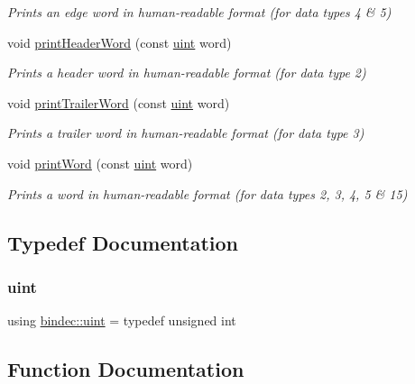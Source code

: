 \begin{DoxyCompactItemize}
\begin{DoxyCompactList}\small\item\em Prints an edge word in human-\/readable format (for data types 4 \& 5) \end{DoxyCompactList}\item 
void \hyperlink{namespacebindec_a185046fdda824c32d42f246df1f1bbba}{print\+Header\+Word} (const \hyperlink{namespacebindec_a61700e6ffcfc677215bfdf223803e735}{uint} word)
\begin{DoxyCompactList}\small\item\em Prints a header word in human-\/readable format (for data type 2) \end{DoxyCompactList}\item 
void \hyperlink{namespacebindec_a7d697577845df9e5e04a8fbbc118dcc5}{print\+Trailer\+Word} (const \hyperlink{namespacebindec_a61700e6ffcfc677215bfdf223803e735}{uint} word)
\begin{DoxyCompactList}\small\item\em Prints a trailer word in human-\/readable format (for data type 3) \end{DoxyCompactList}\item 
void \hyperlink{namespacebindec_ac6d286aca6c2fa2fa29938e4d8247cfa}{print\+Word} (const \hyperlink{namespacebindec_a61700e6ffcfc677215bfdf223803e735}{uint} word)
\begin{DoxyCompactList}\small\item\em Prints a word in human-\/readable format (for data types 2, 3, 4, 5 \& 15) \end{DoxyCompactList}\end{DoxyCompactItemize}


\subsection{Typedef Documentation}
\mbox{\label{namespacebindec_a61700e6ffcfc677215bfdf223803e735}} 
\subsubsection{\texorpdfstring{uint}{uint}}
{\footnotesize\ttfamily using \hyperlink{namespacebindec_a61700e6ffcfc677215bfdf223803e735}{bindec\+::uint} = typedef unsigned int}



\subsection{Function Documentation}
\mbox{\label{namespacebindec_ad029aeb7b485d578e5f3ce91a9cf85f6}} 
